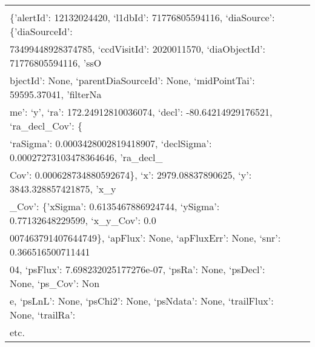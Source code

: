 \begin{longtable}[]{p{1.3cm}p{2cm}p{13cm}}
\begin{minipage}[t]{13cm}{\footnotesize
Similar to\\[2\baselineskip]\{'alertId': 12132024420, `l1dbId':
71776805594116, `diaSource': \{'diaSourceId':\\
73499448928374785, `ccdVisitId': 2020011570, `diaObjectId':
71776805594116, 'ssO\\
bjectId': None, `parentDiaSourceId': None, `midPointTai': 59595.37041,
'filterNa\\
me': `y', `ra': 172.24912810036074, `decl': -80.64214929176521,
`ra\_decl\_Cov': \{\\
`raSigma': 0.0003428002819418907, `declSigma': 0.00027273103478364646,
'ra\_decl\_\\
Cov': 0.000628734880592674\}, `x': 2979.08837890625, `y':
3843.328857421875, 'x\_y\\
\_Cov': \{'xSigma': 0.6135467886924744, `ySigma': 0.77132648229599,
`x\_y\_Cov': 0.0\\
007463791407644749\}, `apFlux': None, `apFluxErr': None, `snr':
0.366516500711441\\
04, `psFlux': 7.698232025177276e-07, `psRa': None, `psDecl': None,
`ps\_Cov': Non\\
e, `psLnL': None, `psChi2': None, `psNdata': None, `trailFlux': None,
`trailRa':\\
etc.

\vspace{\dp0}
} \end{minipage} 


\\ \midrule

\end{longtable}




